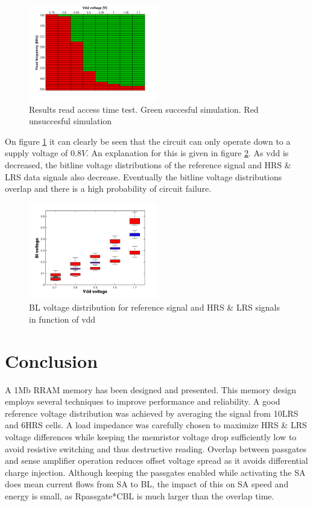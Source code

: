 \documentclass[journal]{IEEEtran}
\begin{document}
\begin{figure}[h!t]
  \centering
  \includegraphics[width=0.5\textwidth]{../fig/hfdst-final-vddspeed.png}
  \caption{Results read access time test. Green succesful simulation. Red unsuccesful simulation}
  \label{fig:speedvdd}
\end{figure}

On figure \ref{fig:speedvdd} it can clearly be seen that the circuit can only operate down to a supply voltage of $0.8V$. An explanation for this is given in figure \ref{fig:vblvdd}. As vdd is decreased, the bitline voltage distributions of the reference signal and HRS \& LRS data signals also decrease. Eventually the bitline voltage distributions overlap and there is a high probability of circuit failure.

\begin{figure}[h!t]
  \centering
  \includegraphics[width=0.5\textwidth]{../fig/hfdst-final-vddbl.png}
  \caption{BL voltage distribution for reference signal and HRS \& LRS signals in function of vdd}
  \label{fig:vblvdd}
\end{figure}




\section{Conclusion}
A 1Mb RRAM memory has been designed and presented. This memory design employs several techniques to improve performance and reliability. A good reference voltage distribution was achieved by averaging the signal from 10LRS and 6HRS cells. A load impedance was carefully chosen to maximize HRS \& LRS voltage differences while keeping the memristor voltage drop sufficiently low to avoid resistive switching and thus destructive reading. Overlap between passgates and sense amplifier operation reduces offset voltage spread as it avoids differential charge injection. Although keeping the passgates enabled while activating the SA does mean current flows from SA to BL, the impact of this on SA speed and energy is small, as Rpassgate*CBL is much larger than the overlap time.


{}

\end{document}
